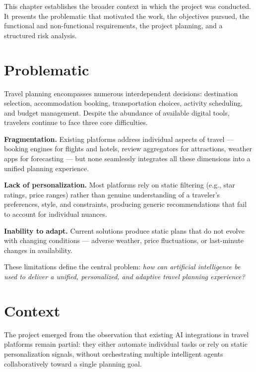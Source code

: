 \documentclass[12pt,a4paper]{report}
\begin{document}
This chapter establishes the broader context in which the project was conducted. It presents the
problematic that motivated the work, the objectives pursued, the functional and non-functional
requirements, the project planning, and a structured risk analysis.

\section{Problematic}

Travel planning encompasses numerous interdependent decisions: destination selection, accommodation
booking, transportation choices, activity scheduling, and budget management. Despite the abundance of
available digital tools, travelers continue to face three core difficulties.

\textbf{Fragmentation.} Existing platforms address individual aspects of travel — booking engines for
flights and hotels, review aggregators for attractions, weather apps for forecasting — but none
seamlessly integrates all these dimensions into a unified planning experience.

\textbf{Lack of personalization.} Most platforms rely on static filtering (e.g., star ratings,
price ranges) rather than genuine understanding of a traveler's preferences, style, and constraints,
producing generic recommendations that fail to account for individual nuances.

\textbf{Inability to adapt.} Current solutions produce static plans that do not evolve with changing
conditions — adverse weather, price fluctuations, or last-minute changes in availability.

These limitations define the central problem: \emph{how can artificial intelligence be used to
deliver a unified, personalized, and adaptive travel planning experience?}

\section{Context}

The project emerged from the observation that existing AI integrations in travel platforms remain
partial: they either automate individual tasks or rely on static personalization signals, without
orchestrating multiple intelligent agents collaboratively toward a single planning goal.
\end{document}
